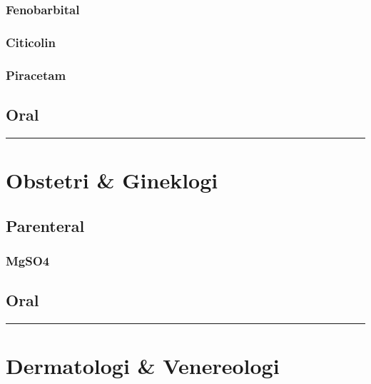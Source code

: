 \documentclass[
]{book}
\begin{document}
\hypertarget{fenobarbital}{%
\subsubsection{Fenobarbital}\label{fenobarbital}}

\hypertarget{citicolin}{%
\subsubsection{Citicolin}\label{citicolin}}

\hypertarget{piracetam}{%
\subsubsection{Piracetam}\label{piracetam}}

\hypertarget{oral-2}{%
\subsection{Oral}\label{oral-2}}

\begin{center}\rule{0.5\linewidth}{0.5pt}\end{center}

\hypertarget{obstetri-gineklogi-2}{%
\section{Obstetri \& Gineklogi}\label{obstetri-gineklogi-2}}

\hypertarget{parenteral-5}{%
\subsection{Parenteral}\label{parenteral-5}}

\hypertarget{mgso4}{%
\subsubsection{MgSO4}\label{mgso4}}

\hypertarget{oral-3}{%
\subsection{Oral}\label{oral-3}}

\begin{center}\rule{0.5\linewidth}{0.5pt}\end{center}

\hypertarget{dermatologi-venereologi-1}{%
\section{Dermatologi \& Venereologi}\label{dermatologi-venereologi-1}}
\end{document}
